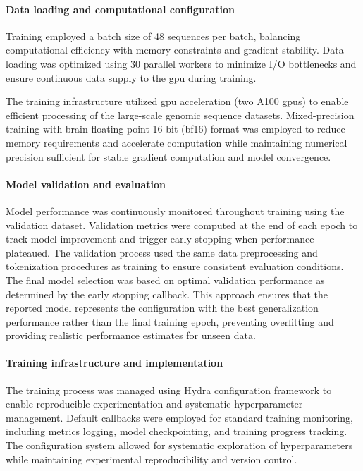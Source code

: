 \documentclass[pdflatex,sn-nature]{sn-jnl}%
\theoremstyle{thmstyleone}%
\theoremstyle{thmstyletwo}%
\theoremstyle{thmstylethree}%
\begin{document}
\paragraph{Data loading and computational configuration}
Training employed a batch size of 48 sequences per batch, balancing computational efficiency with memory constraints and gradient stability.
Data loading was optimized using 30 parallel workers to minimize I/O bottlenecks and ensure continuous data supply to the \gls{gpu} during training.

The training infrastructure utilized \gls{gpu} acceleration (two A100 \glspl{gpu}) to enable efficient processing of the large-scale genomic sequence datasets.
Mixed-precision training with brain floating-point 16-bit (bf16) format was employed to reduce memory requirements and accelerate computation while maintaining numerical precision sufficient for stable gradient computation and model convergence.

\paragraph{Model validation and evaluation}
Model performance was continuously monitored throughout training using the validation dataset.
Validation metrics were computed at the end of each epoch to track model improvement and trigger early stopping when performance plateaued.
The validation process used the same data preprocessing and tokenization procedures as training to ensure consistent evaluation conditions.
The final model selection was based on optimal validation performance as determined by the early stopping callback.
This approach ensures that the reported model represents the configuration with the best generalization performance rather than the final training epoch, preventing overfitting and providing realistic performance estimates for unseen data.

\paragraph{Training infrastructure and implementation}
The training process was managed using Hydra configuration framework to enable reproducible experimentation and systematic hyperparameter management.
Default callbacks were employed for standard training monitoring, including metrics logging, model checkpointing, and training progress tracking.
The configuration system allowed for systematic exploration of hyperparameters while maintaining experimental reproducibility and version control.
\end{document}
